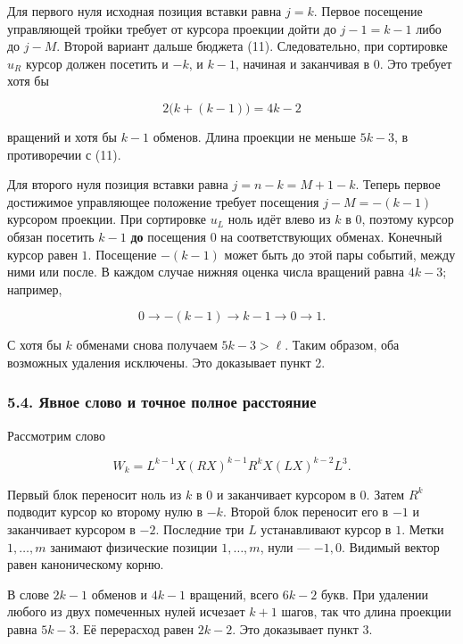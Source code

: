 \documentclass[
  11pt,
  a4paper,
]{article}
\begin{document}
Для первого нуля исходная позиция вставки равна \(j=k\). Первое
посещение управляющей тройки требует от курсора проекции дойти до
\(j-1=k-1\) либо до \(j-M\). Второй вариант дальше бюджета (11).
Следовательно, при сортировке \(u_R\) курсор должен посетить и \(-k\), и
\(k-1\), начиная и заканчивая в \(0\). Это требует хотя бы

\[2\bigl(k+(k-1)\bigr)=4k-2\]

вращений и хотя бы \(k-1\) обменов. Длина проекции не меньше \(5k-3\), в
противоречии с (11).

Для второго нуля позиция вставки равна \(j=n-k=M+1-k\). Теперь первое
достижимое управляющее положение требует посещения \(j-M=-(k-1)\)
курсором проекции. При сортировке \(u_L\) ноль идёт влево из \(k\) в
\(0\), поэтому курсор обязан посетить \(k-1\) \textbf{до} посещения
\(0\) на соответствующих обменах. Конечный курсор равен \(1\). Посещение
\(-(k-1)\) может быть до этой пары событий, между ними или после. В
каждом случае нижняя оценка числа вращений равна \(4k-3\); например,

\[0\longrightarrow -(k-1)\longrightarrow k-1
\longrightarrow0\longrightarrow1.\]

С хотя бы \(k\) обменами снова получаем \(5k-3>\ell\). Таким образом,
оба возможных удаления исключены. Это доказывает пункт 2.

\hypertarget{ux44fux432ux43dux43eux435-ux441ux43bux43eux432ux43e-ux438-ux442ux43eux447ux43dux43eux435-ux43fux43eux43bux43dux43eux435-ux440ux430ux441ux441ux442ux43eux44fux43dux438ux435}{%
\subsubsection{5.4. Явное слово и точное полное
расстояние}\label{ux44fux432ux43dux43eux435-ux441ux43bux43eux432ux43e-ux438-ux442ux43eux447ux43dux43eux435-ux43fux43eux43bux43dux43eux435-ux440ux430ux441ux441ux442ux43eux44fux43dux438ux435}}

Рассмотрим слово

\[\boxed{W_k=L^{k-1}X(RX)^{k-1}R^kX(LX)^{k-2}L^3.} \tag{12}\]

Первый блок переносит ноль из \(k\) в \(0\) и заканчивает курсором в
\(0\). Затем \(R^k\) подводит курсор ко второму нулю в \(-k\). Второй
блок переносит его в \(-1\) и заканчивает курсором в \(-2\). Последние
три \(L\) устанавливают курсор в \(1\). Метки \(1,\ldots,m\) занимают
физические позиции \(1,\ldots,m\), нули --- \(-1,0\). Видимый вектор
равен каноническому корню.

В слове \(2k-1\) обменов и \(4k-1\) вращений, всего \(6k-2\) букв. При
удалении любого из двух помеченных нулей исчезает \(k+1\) шагов, так что
длина проекции равна \(5k-3\). Её перерасход равен \(2k-2\). Это
доказывает пункт 3.
\end{document}
